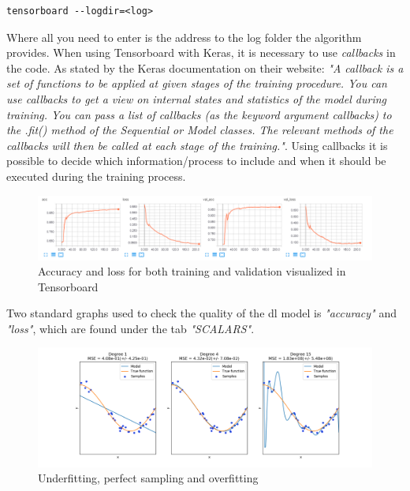 \documentclass[USenglish]{ifimaster}  %
\begin{document}
\begin{verbatim}
tensorboard --logdir=<log> 
\end{verbatim}
Where all you need to enter is the address to the log folder the algorithm provides. 
\newline
When using Tensorboard with Keras, it is necessary to use \textit{callbacks} in the code. As stated by the Keras documentation on their website:
\newline
\newline
\textit{"A callback is a set of functions to be applied at given stages of the training procedure. You can use callbacks to get a view on internal states and statistics of the model during training. You can pass a list of callbacks (as the keyword argument callbacks) to the .fit() method of the Sequential or Model classes. The relevant methods of the callbacks will then be called at each stage of the training."}\cite{website:Keras_doc}. 
\newline
\newline
Using callbacks it is possible to decide which information/process to include and when it should be executed during the training process.
\begin{figure}[ht]
    \centering
    \includegraphics[width=1\textwidth]{bilder/tensorboard_acc_loss.PNG}
    \caption{Accuracy and loss for both training and validation visualized in Tensorboard}
    \label{fig:accuracy_loss}
\end{figure}
\newline
Two standard graphs used to check the quality of the \ac{dl} model is \textit{"accuracy"} and \textit{"loss"}, which are found under the tab \textit{"SCALARS"}. 
\begin{figure}[ht]
    \centering
    \includegraphics[width=1\textwidth]{bilder/overfitting_underfitting.png}
    \caption{Underfitting, perfect sampling and overfitting \cite{website:overfitting_underfitting}}
    \label{fig:overfitting_underfitting}
\end{figure}
\end{document}
